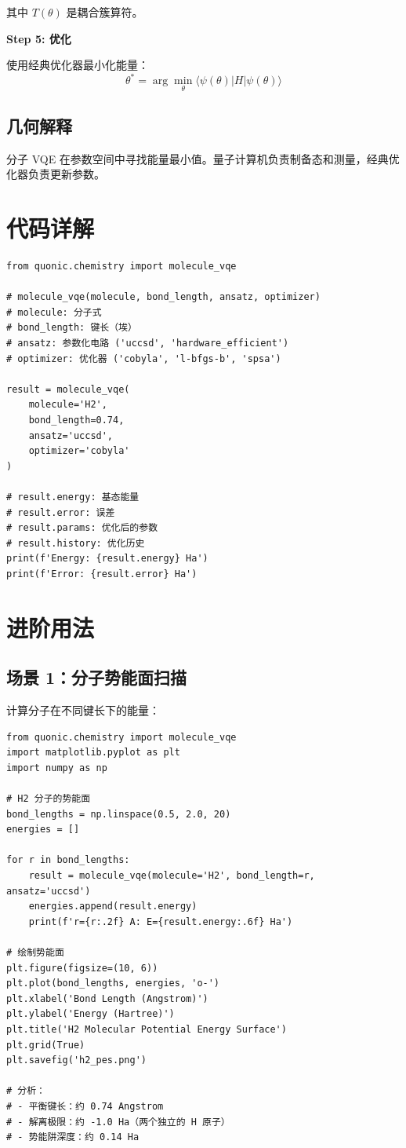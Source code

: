 \documentclass[12pt,a4paper]{article}
\begin{document}
其中 $T(\theta)$ 是耦合簇算符。

\textbf{Step 5: 优化}

使用经典优化器最小化能量：
\begin{equation}
\theta^* = \arg\min_\theta \langle\psi(\theta)|H|\psi(\theta)\rangle
\end{equation}

\subsection{几何解释}

分子 VQE 在参数空间中寻找能量最小值。量子计算机负责制备态和测量，经典优化器负责更新参数。

\section{代码详解}

\begin{verbatim}
from quonic.chemistry import molecule_vqe

# molecule_vqe(molecule, bond_length, ansatz, optimizer)
# molecule: 分子式
# bond_length: 键长（埃）
# ansatz: 参数化电路 ('uccsd', 'hardware_efficient')
# optimizer: 优化器 ('cobyla', 'l-bfgs-b', 'spsa')

result = molecule_vqe(
    molecule='H2',
    bond_length=0.74,
    ansatz='uccsd',
    optimizer='cobyla'
)

# result.energy: 基态能量
# result.error: 误差
# result.params: 优化后的参数
# result.history: 优化历史
print(f'Energy: {result.energy} Ha')
print(f'Error: {result.error} Ha')
\end{verbatim}

\section{进阶用法}

\subsection{场景 1：分子势能面扫描}

计算分子在不同键长下的能量：

\begin{verbatim}
from quonic.chemistry import molecule_vqe
import matplotlib.pyplot as plt
import numpy as np

# H2 分子的势能面
bond_lengths = np.linspace(0.5, 2.0, 20)
energies = []

for r in bond_lengths:
    result = molecule_vqe(molecule='H2', bond_length=r, ansatz='uccsd')
    energies.append(result.energy)
    print(f'r={r:.2f} A: E={result.energy:.6f} Ha')

# 绘制势能面
plt.figure(figsize=(10, 6))
plt.plot(bond_lengths, energies, 'o-')
plt.xlabel('Bond Length (Angstrom)')
plt.ylabel('Energy (Hartree)')
plt.title('H2 Molecular Potential Energy Surface')
plt.grid(True)
plt.savefig('h2_pes.png')

# 分析：
# - 平衡键长：约 0.74 Angstrom
# - 解离极限：约 -1.0 Ha（两个独立的 H 原子）
# - 势能阱深度：约 0.14 Ha
\end{verbatim}
\end{document}
